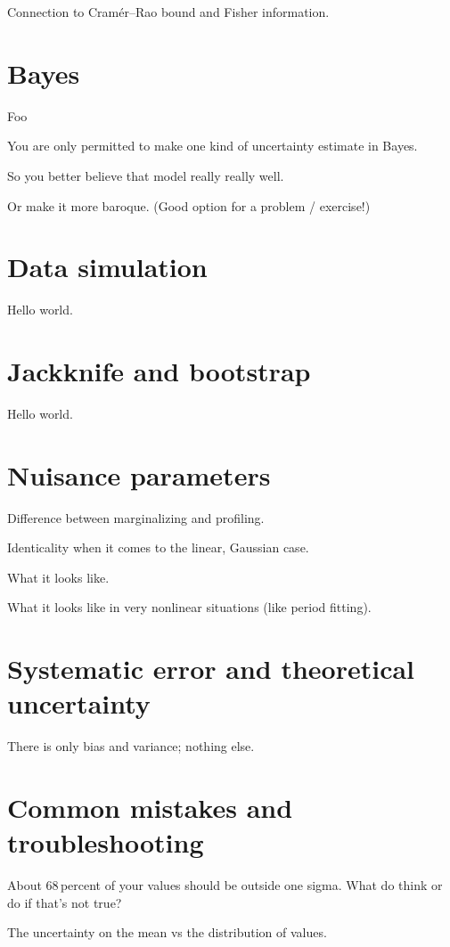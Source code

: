 \documentclass[12pt, letterpaper]{article}
\begin{document}
Connection to Cram\'er--Rao bound and Fisher information.

\section{Bayes}

Foo

You are only permitted to make one kind of uncertainty estimate in Bayes.

So you better believe that model really really well.

Or make it more baroque. (Good option for a problem / exercise!)

\section{Data simulation}

Hello world.

\section{Jackknife and bootstrap}

Hello world.

\section{Nuisance parameters}

Difference between marginalizing and profiling.

Identicality when it comes to the linear, Gaussian case.

What it looks like.

What it looks like in very nonlinear situations (like period fitting).

\section{Systematic error and theoretical uncertainty}

There is only bias and variance; nothing else.

\section{Common mistakes and troubleshooting}

About 68\,percent of your values should be outside one sigma. What do think
or do if that's not true?

The uncertainty on the mean vs the distribution of values.
\end{document}
